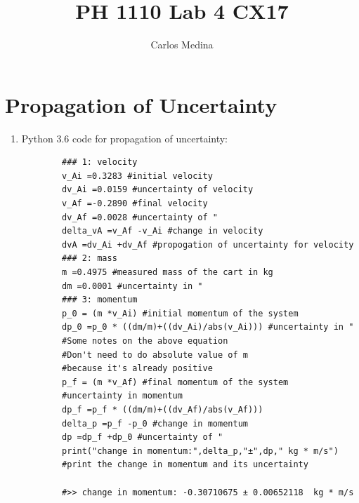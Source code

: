 \documentclass[12pt]{article}
\author{Carlos Medina}
\title{PH 1110 Lab 4 CX17}
\begin{document}
    \setlength{\droptitle}{-60pt}
    \maketitle


    \section{Propagation of Uncertainty}
    \begin{enumerate}
        [1)]
        \item Python 3.6 code for propagation of uncertainty:
        \begin{verbatim}
        ### 1: velocity
        v_Ai =0.3283 #initial velocity
        dv_Ai =0.0159 #uncertainty of velocity
        v_Af =-0.2890 #final velocity
        dv_Af =0.0028 #uncertainty of "
        delta_vA =v_Af -v_Ai #change in velocity
        dvA =dv_Ai +dv_Af #propogation of uncertainty for velocity
        ### 2: mass
        m =0.4975 #measured mass of the cart in kg
        dm =0.0001 #uncertainty in "
        ### 3: momentum
        p_0 = (m *v_Ai) #initial momentum of the system
        dp_0 =p_0 * ((dm/m)+((dv_Ai)/abs(v_Ai))) #uncertainty in "
        #Some notes on the above equation
        #Don't need to do absolute value of m
        #because it's already positive
        p_f = (m *v_Af) #final momentum of the system
        #uncertainty in momentum
        dp_f =p_f * ((dm/m)+((dv_Af)/abs(v_Af)))
        delta_p =p_f -p_0 #change in momentum
        dp =dp_f +dp_0 #uncertainty of "
        print("change in momentum:",delta_p,"±",dp," kg * m/s")
        #print the change in momentum and its uncertainty

        #>> change in momentum: -0.30710675 ± 0.00652118  kg * m/s
        \end{verbatim}
    \end{enumerate}
\end{document}
